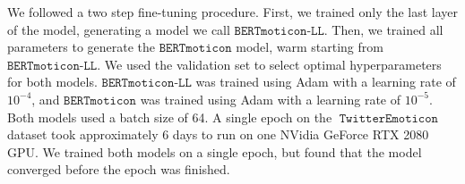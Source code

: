 \documentclass[11pt]{article}
\newcommand{\bertmoji}{\texttt{BERTmoticon}}
\newcommand{\bertmojill}{\texttt{BERTmoticon-LL}}
\DeclareMathOperator{\emoticon}{\texttt{TwitterEmoticon}}
\begin{document}
We followed a two step fine-tuning procedure.
First, we trained only the last layer of the model,
generating a model we call $\bertmojill$.
Then, we trained all parameters to generate the $\bertmoji$ model,
warm starting from $\bertmojill$.
We used the validation set to select optimal hyperparameters for both models.
$\bertmojill$ was trained using Adam \citep{kingma2014adam} with a learning rate of $10^{-4}$,
and $\bertmoji$ was trained using Adam with a learning rate of $10^{-5}$.
Both models used a batch size of 64.
A single epoch on the $\emoticon$ dataset took approximately 6 days to run on one NVidia GeForce RTX 2080 GPU.
We trained both models on a single epoch, but found that the model converged before the epoch was finished.
%

\end{document}

